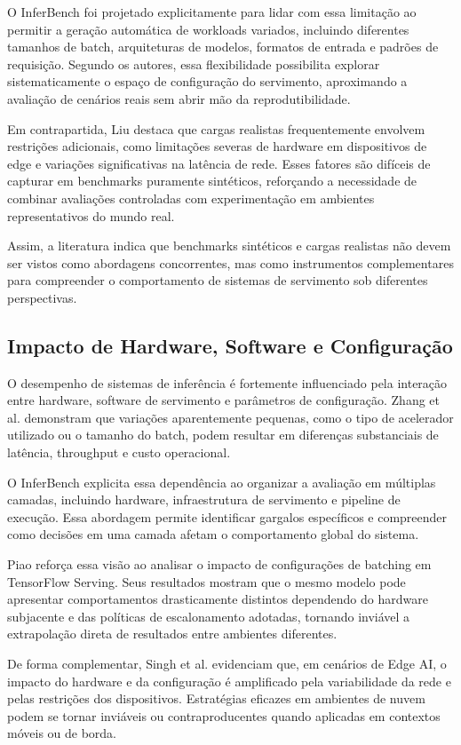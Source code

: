 O InferBench foi projetado explicitamente para lidar com essa limitação ao permitir a geração automática de workloads variados, incluindo diferentes tamanhos de batch, arquiteturas de modelos, formatos de entrada e padrões de requisição. Segundo os autores, essa flexibilidade possibilita explorar sistematicamente o espaço de configuração do servimento, aproximando a avaliação de cenários reais sem abrir mão da reprodutibilidade.

Em contrapartida, Liu destaca que cargas realistas frequentemente envolvem restrições adicionais, como limitações severas de hardware em dispositivos de edge e variações significativas na latência de rede. Esses fatores são difíceis de capturar em benchmarks puramente sintéticos, reforçando a necessidade de combinar avaliações controladas com experimentação em ambientes representativos do mundo real.

Assim, a literatura indica que benchmarks sintéticos e cargas realistas não devem ser vistos como abordagens concorrentes, mas como instrumentos complementares para compreender o comportamento de sistemas de servimento sob diferentes perspectivas.
\subsection{Impacto de Hardware, Software e Configuração}
O desempenho de sistemas de inferência é fortemente influenciado pela interação entre hardware, software de servimento e parâmetros de configuração. Zhang et al. demonstram que variações aparentemente pequenas, como o tipo de acelerador utilizado ou o tamanho do batch, podem resultar em diferenças substanciais de latência, throughput e custo operacional.

O InferBench explicita essa dependência ao organizar a avaliação em múltiplas camadas, incluindo hardware, infraestrutura de servimento e pipeline de execução. Essa abordagem permite identificar gargalos específicos e compreender como decisões em uma camada afetam o comportamento global do sistema.

Piao reforça essa visão ao analisar o impacto de configurações de batching em TensorFlow Serving. Seus resultados mostram que o mesmo modelo pode apresentar comportamentos drasticamente distintos dependendo do hardware subjacente e das políticas de escalonamento adotadas, tornando inviável a extrapolação direta de resultados entre ambientes diferentes.

De forma complementar, Singh et al. evidenciam que, em cenários de Edge AI, o impacto do hardware e da configuração é amplificado pela variabilidade da rede e pelas restrições dos dispositivos. Estratégias eficazes em ambientes de nuvem podem se tornar inviáveis ou contraproducentes quando aplicadas em contextos móveis ou de borda.
